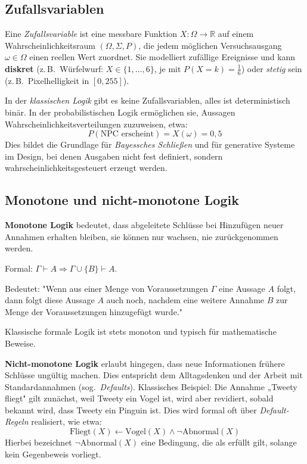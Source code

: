 \documentclass[parskip=half,a4paper,11pt]{scrreprt}
\begin{document}
\subsection{Zufallsvariablen}

Eine \textit{Zufallsvariable} ist eine messbare Funktion $X: \Omega \to \mathbb{R}$ auf einem Wahrscheinlichkeitsraum $(\Omega, \Sigma, P)$, die jedem möglichen Versuchsausgang $\omega \in \Omega$ einen reellen Wert zuordnet. Sie modelliert zufällige Ereignisse und kann \textbf{diskret} (z.\,B.\ Würfelwurf: $X \in \{1,\ldots,6\}$, je mit $P(X=k) = \tfrac{1}{6}$) oder \textit{stetig} sein (z.\,B.\ Pixelhelligkeit in $[0, 255]$).

In der \textit{klassischen Logik} gibt es keine Zufallsvariablen, alles ist deterministisch binär. In der probabilistischen Logik ermöglichen sie, Aussagen Wahrscheinlichkeitsverteilungen zuzuweisen, etwa:
\[
    P(\text{NPC erscheint}) = X(\omega) = 0{,}5
\]
Dies bildet die Grundlage für \textit{Bayessches Schließen}\textbf{ }und für generative Systeme im Design, bei denen Ausgaben nicht fest definiert, sondern wahrscheinlichkeitsgesteuert erzeugt werden.

\subsection{Monotone und nicht-monotone Logik}

\textbf{Monotone Logik} bedeutet, dass abgeleitete Schlüsse bei Hinzufügen neuer Annahmen erhalten bleiben, sie können nur wachsen, nie zurückgenommen werden. 

Formal: $\Gamma \vdash A \Rightarrow \Gamma \cup \{B\} \vdash A$. 

Bedeutet: "Wenn aus einer Menge von Voraussetzungen $\Gamma$ eine Aussage $A$ folgt, dann folgt diese Aussage $A$ auch noch, nachdem eine weitere Annahme $B$ zur Menge der Voraussetzungen hinzugefügt wurde."

Klassische formale Logik ist stets monoton und typisch für mathematische Beweise.

\textbf{Nicht-monotone Logik} erlaubt hingegen, dass neue Informationen frühere Schlüsse ungültig machen. Dies entspricht dem Alltagsdenken und der Arbeit mit Standardannahmen (sog.\ \textit{Defaults}). Klassisches Beispiel: Die Annahme „Tweety fliegt" gilt zunächst, weil Tweety ein Vogel ist, wird aber revidiert, sobald bekannt wird, dass Tweety ein Pinguin ist. Dies wird formal oft über \textit{Default-Regeln} realisiert, wie etwa:
\[ \text{Fliegt}(X) \leftarrow \text{Vogel}(X) \land \neg \text{Abnormal}(X) \]
Hierbei bezeichnet $\neg \text{Abnormal}(X)$ eine Bedingung, die als erfüllt gilt, solange kein Gegenbeweis vorliegt. 
\end{document}
